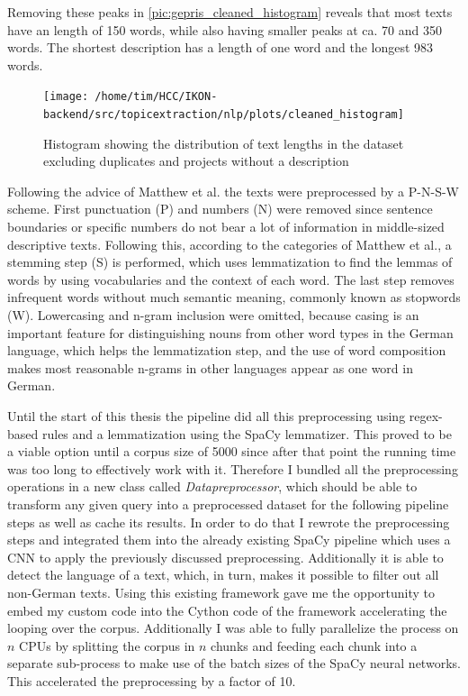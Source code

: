 Removing these peaks in \autoref{pic:gepris_cleaned_histogram} reveals that most texts have an length of 150 words, while also having smaller peaks at ca. 70 and 350 words. The shortest description has a length of one word and the longest  983 words.

\begin{figure}[t]
	\centering
	\texttt{[image: /home/tim/HCC/IKON-backend/src/topicextraction/nlp/plots/cleaned\_histogram]}
	\caption{\label{pic:gepris_cleaned_histogram} Histogram showing the distribution of text lengths in the dataset excluding duplicates and projects without a description}
\end{figure}

Following the advice of Matthew et al. \cite{dennymatthewpennstateuniversity;spirlingarthurnewyorkuniversityReplicationDataText2017} the texts were preprocessed by a P-N-S-W scheme. First punctuation (P) and numbers (N) were removed since sentence boundaries or specific numbers do not bear a lot of information in middle-sized descriptive texts. Following this, according to the categories of Matthew et al., a stemming step (S) is performed, which uses lemmatization to find the lemmas of words by using vocabularies and the context of each word. The last step removes infrequent words without much semantic meaning, commonly known as stopwords (W). Lowercasing and n-gram inclusion were omitted, because casing is an important feature for distinguishing nouns from other word types in the German language, which helps the lemmatization step, and the use of word composition makes most reasonable n-grams in other languages appear as one word in German. 

Until the start of this thesis the pipeline did all this preprocessing using regex-based rules and a lemmatization using the SpaCy lemmatizer. This proved to be a viable option until a corpus size of 5000 since after that point the running time was too long to effectively work with it. Therefore I bundled all the preprocessing operations in a new class called \textit{Datapreprocessor}, which should be able to transform any given query into a preprocessed dataset for the following pipeline steps as well as cache its results. In order to do that I rewrote the preprocessing steps and integrated them into the already existing SpaCy pipeline which uses a CNN to apply the previously discussed preprocessing. Additionally it is able to detect the language of a text, which, in turn, makes it possible to filter out all non-German texts. Using this existing framework gave me the opportunity to embed my custom code into the Cython code of the framework accelerating the looping over the corpus. Additionally I was able to fully parallelize the process on $n$ CPUs by splitting the corpus in $n$ chunks and feeding each chunk into a separate sub-process to make use of the batch sizes of the SpaCy neural networks. This accelerated the preprocessing by a factor of 10.

